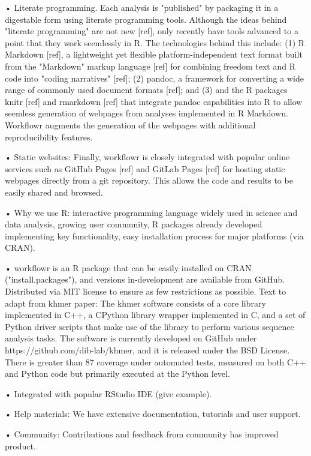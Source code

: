 \documentclass[9pt,a4paper]{extarticle}
\begin{document}
• Literate programming. Each analysis is "published" by packaging it in
a digestable form using literate programming tools. Although the ideas
behind "literate programming" are not new [ref], only recently have
tools advanced to a point that they work seemlessly in R. The
technologies behind this include: (1) R Markdown [ref], a lightweight
yet flexible platform-independent text format built from the "Markdown"
markup language [ref] for combining freedom text and R code into "coding
narratives" [ref]; (2) pandoc, a framework for converting a wide range
of commonly used document formats [ref]; and (3) and the R packages
knitr [ref] and rmarkdown [ref] that integrate pandoc capabilities into
R to allow seemless generation of webpages from analyses implemented in
R Markdown. Workflowr augments the generation of the webpages with
additional reproducibility features.

• Static websites: Finally, workflowr is closely integrated with popular
online services such as GitHub Pages [ref] and GitLab Pages [ref] for
hosting static webpages directly from a git repository. This allows the
code and results to be easily shared and browsed.

• Why we use R: interactive programming language widely used in science
and data analysis, growing user community, R packages already developed
implementing key functionality, easy installation process for major
platforms (via CRAN).

• workflowr is an R package that can be easily installed on CRAN
("install.packages"), and versions in-development are available from
GitHub. Distributed via MIT license to ensure as few restrictions as
possible. Text to adapt from khmer paper: The khmer software consists of
a core library implemented in C++, a CPython library wrapper implemented
in C, and a set of Python driver scripts that make use of the library to
perform various sequence analysis tasks. The software is currently
developed on GitHub under https://github.com/dib-lab/khmer, and it is
released under the BSD License. There is greater than 87%
coverage under automated tests, measured on both C++ and Python code but
primarily executed at the Python level.

• Integrated with popular RStudio IDE (give example).

• Help materials: We have extensive documentation, tutorials and user
support.

• Community: Contributions and feedback from community has improved
product.
\end{document}
